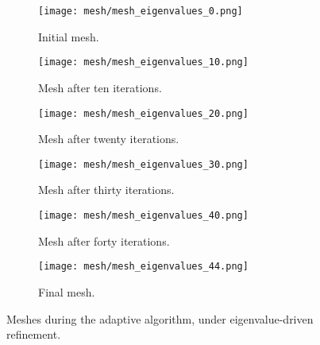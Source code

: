 \documentclass[12pt]{amsart}
\begin{document}
\begin{figure}[htbp]
    \begin{subfigure}[t]{0.49\textwidth}
        \centering
        \texttt{[image: mesh/mesh\_eigenvalues\_0.png]}
        \caption{Initial mesh.}
        \label{fig:mesh_0}
    \end{subfigure}
    \begin{subfigure}[t]{0.49\textwidth}
        \centering
        \texttt{[image: mesh/mesh\_eigenvalues\_10.png]}
        \caption{Mesh after ten iterations.}
        \label{fig:mesh_10}
    \end{subfigure}
    \vspace{1cm}
    \begin{subfigure}[t]{0.49\textwidth}
        \centering
        \texttt{[image: mesh/mesh\_eigenvalues\_20.png]}
        \caption{Mesh after twenty iterations.}
        \label{fig:mesh_20}
    \end{subfigure}
    \begin{subfigure}[t]{0.49\textwidth}
        \centering
        \texttt{[image: mesh/mesh\_eigenvalues\_30.png]}
        \caption{Mesh after thirty iterations.}
        \label{fig:mesh_30}
    \end{subfigure}
    \vspace{1cm}
    \begin{subfigure}[t]{0.49\textwidth}
        \centering
        \texttt{[image: mesh/mesh\_eigenvalues\_40.png]}
        \caption{Mesh after forty iterations.}
        \label{fig:mesh_40}
    \end{subfigure}
    \begin{subfigure}[t]{0.49\textwidth}
        \centering
        \texttt{[image: mesh/mesh\_eigenvalues\_44.png]}
        \caption{Final mesh.}
        \label{fig:mesh_50}
    \end{subfigure}
    \caption{Meshes during the adaptive algorithm, under eigenvalue-driven refinement.}
\end{figure}
\end{document}
